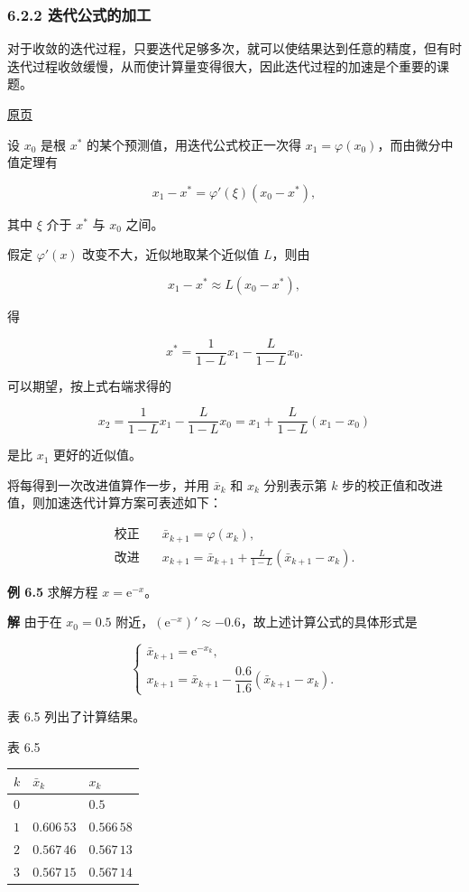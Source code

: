 \documentclass[
  10pt,
  fontset=fandol]{ctexart}
\newcounter{none} %
\begin{document}
\subsubsection{6.2.2 迭代公式的加工}\label{ux8fedux4ee3ux516cux5f0fux7684ux52a0ux5de5}

对于收敛的迭代过程，只要迭代足够多次，就可以使结果达到任意的精度，但有时迭代过程收敛缓慢，从而使计算量变得很大，因此迭代过程的加速是个重要的课题。

\href{../../source-images/pdf-161.jpeg}{原页}

设 \(x_0\) 是根 \(x^*\) 的某个预测值，用迭代公式校正一次得 \(x_1=\varphi(x_0)\)，而由微分中值定理有

\[
x_1-x^*=\varphi'(\xi)(x_0-x^*),
\]

其中 \(\xi\) 介于 \(x^*\) 与 \(x_0\) 之间。

假定 \(\varphi'(x)\) 改变不大，近似地取某个近似值 \(L\)，则由

\[
x_1-x^*\approx L(x_0-x^*),
\]

得

\[
x^*=\frac{1}{1-L}x_1-\frac{L}{1-L}x_0.
\tag{6.2.9}
\]

可以期望，按上式右端求得的

\[
x_2=\frac{1}{1-L}x_1-\frac{L}{1-L}x_0=x_1+\frac{L}{1-L}(x_1-x_0)
\]

是比 \(x_1\) 更好的近似值。

将每得到一次改进值算作一步，并用 \(\bar{x}_k\) 和 \(x_k\) 分别表示第 \(k\) 步的校正值和改进值，则加速迭代计算方案可表述如下：

\[
\begin{aligned}
\text{校正}\quad&\bar{x}_{k+1}=\varphi(x_k),\\
\text{改进}\quad&x_{k+1}=\bar{x}_{k+1}+\frac{L}{1-L}(\bar{x}_{k+1}-x_k).
\end{aligned}
\tag{6.2.10}
\]

\textbf{例 6.5} 求解方程 \(x=\mathrm{e}^{-x}\)。

\textbf{解} 由于在 \(x_0=0.5\) 附近，\((\mathrm{e}^{-x})'\approx-0.6\)，故上述计算公式的具体形式是

\[
\begin{cases}
\bar{x}_{k+1}=\mathrm{e}^{-x_k},\\
x_{k+1}=\bar{x}_{k+1}-\dfrac{0.6}{1.6}(\bar{x}_{k+1}-x_k).
\end{cases}
\]

表 6.5 列出了计算结果。

表 6.5

{\def\LTcaptype{none} %
\begin{longtable}[]{@{}lll@{}}
\toprule\noalign{}
\(k\) & \(\bar{x}_k\) & \(x_k\) \\
\midrule\noalign{}
\endhead
\bottomrule\noalign{}
\endlastfoot
\(0\) & & \(0.5\) \\
\(1\) & \(0.606\,53\) & \(0.566\,58\) \\
\(2\) & \(0.567\,46\) & \(0.567\,13\) \\
\(3\) & \(0.567\,15\) & \(0.567\,14\) \\
\end{longtable}
}
\end{document}
